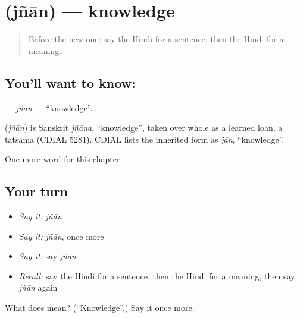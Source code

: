 \section[\texorpdfstring{\hi{ज्ञान} (jñān)}{ज्ञान (jñān)}]{ (jñān) — knowledge}

\label{lesson:HI-C198-jnan}



\begin{quote}
Before the new one: say the Hindi for a sentence, then the Hindi for a meaning.
\end{quote}

\subsection*{You'll want to know: }
\textbf{} — \emph{jñān} — \textquotedblleft{}knowledge\textquotedblright{}.

\begin{cousinweb}
\textbf{} (\emph{jñān}) is Sanskrit \emph{jñāna}, \textquotedblleft{}knowledge\textquotedblright{}, taken over whole as a learned loan, a tatsama (CDIAL 5281). CDIAL lists the inherited form as \emph{jān}, \textquotedblleft{}knowledge\textquotedblright{}.
\end{cousinweb}

\begin{grammarlens}[title={What you've built}]
One more word for this chapter.
\end{grammarlens}

\subsection*{Your turn}
\begin{itemize}
\raggedright
  \item \emph{Say it:} \emph{jñān}
  \item \emph{Say it:} \emph{jñān}, once more
  \item \emph{Say it:} say \emph{jñān}
  \item \emph{Recall:} say the Hindi for a sentence, then the Hindi for a meaning, then say \emph{jñān} again
\end{itemize}

\begin{tcolorbox}[breakable,colback=teal!4,colframe=teal!35!black,title={Before you move on}]
What does  mean? (\textquotedblleft{}Knowledge\textquotedblright{}.) Say it once more.
\end{tcolorbox}
